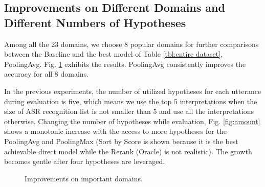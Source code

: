 \subsection{Improvements on Different Domains and Different Numbers of Hypotheses}
Among all the 23 domains, we choose 8 popular domains for further comparisons between the Baseline and the best model of Table \ref{tbl:entire dataset}, PoolingAvg. Fig. \ref{fig:important} exhibits the results.  PoolingAvg consistently improves the accuracy for all 8 domains.

In the previous experiments, the number of utilized hypotheses for each utterance during evaluation is five, which means we use the top 5 interpretations when the size of ASR recognition list is not smaller than 5 and use all the interpretations otherwise. Changing the number of hypotheses while evaluation, Fig. \ref{fig:amount} shows a monotonic increase with the access to more hypotheses for the PoolingAvg and PoolingMax (Sort by Score is shown because it is the best achievable direct model while the Rerank (Oracle) is not realistic). The growth becomes gentle after four hypotheses are leveraged. 
\begin{figure}[h]
	\centering

	\caption{Improvements on important domains.}
	\label{fig:important}

	
\end{figure}

